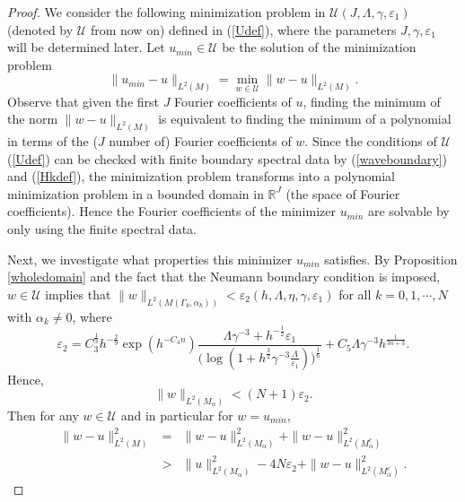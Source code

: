 \documentclass[11pt,letterpaper]{amsart}
\numberwithin{equation}{section}
\theoremstyle{definition}
\theoremstyle{plain}
\theoremstyle{definition}
\theoremstyle{plain}
\theoremstyle{definition}
\theoremstyle{plain}
\begin{document}
\begin{proof}
We consider the following minimization problem in $\mathcal{U}(J,\Lambda,\gamma,\varepsilon_1)$ (denoted by $\mathcal{U}$ from now on) defined in (\ref{Udef}), where the parameters $J,\gamma,\varepsilon_1$ will be determined later. Let $u_{min}\in\mathcal{U}$ be the solution of the minimization problem
\begin{equation}\label{minimization}
\|u_{min}-u\|_{L^2(M)}=\min_{w\in \mathcal{U}} \|w-u\|_{L^2(M)}.
\end{equation}
Observe that given the first $J$ Fourier coefficients of $u$, finding the minimum of the norm $\|w-u\|_{L^2(M)}$ is equivalent to finding the minimum of a polynomial in terms of the ($J$ number of) Fourier coefficients of $w$. Since the conditions of $\mathcal{U}$ (\ref{Udef}) can be checked with finite boundary spectral data by (\ref{waveboundary}) and (\ref{Hkdef}), the minimization problem transforms into a polynomial minimization problem in a bounded domain in $\mathbb{R}^J$ (the space of Fourier coefficients). Hence the Fourier coefficients of the minimizer $u_{min}$ are solvable by only using the finite spectral data.

\smallskip
Next, we investigate what properties this minimizer $u_{min}$ satisfies. By Proposition \ref{wholedomain} and the fact that the Neumann boundary condition is imposed, $w\in\mathcal{U}$ implies that $\|w\|_{L^2(M(\Gamma_k,\alpha_k))}< \varepsilon_2(h,\Lambda,\eta,\gamma,\varepsilon_1)$ for all $k=0,1,\cdots,N$ with $\alpha_k\neq 0$, where
\begin{equation}\label{epsilon20}
\varepsilon_2=C_3^{\frac{1}{3}}h^{-\frac{2}{9}}\exp(h^{-C_4 n}) \frac{\Lambda\gamma^{-3}+h^{-\frac{1}{2}}\varepsilon_1}{\big(\log (1+h^{\frac{3}{2}}\gamma^{-3}\frac{\Lambda}{\varepsilon_1})\big) ^{\frac{1}{6}}}+C_5\Lambda\gamma^{-3} h^{\frac{1}{3n+3}}.
\end{equation}
Hence,
$$\|w\|_{L^2(M_{\alpha})} < (N+1)\varepsilon_2.$$
Then for any $w\in \mathcal{U}$ and in particular for $w=u_{min}$,
\begin{eqnarray} \label{lower}
\|w-u\|_{L^2(M)}^2 &=&  \|w-u\|_{L^2(M_{\alpha})}^2+  \|w-u\|_{L^2(M_{\alpha}^c)}^2 \nonumber \\
&>& \|u\|^2_{L^2(M_{\alpha})}-4N\varepsilon_2 +  \|w-u\|^2_{L^2(M_{\alpha}^c)}.
\end{eqnarray}


\end{proof}
\end{document}

